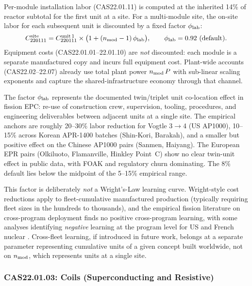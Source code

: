 \documentclass{article}
\begin{document}
Per-module installation labor (CAS22.01.11) is computed at the
inherited 14\% of reactor subtotal for the first unit at a site. For
a multi-module site, the on-site labor for each subsequent unit is
discounted by a fixed factor $\phi_{\rm lab}$:
\begin{equation}
\label{eq:multi-unit-labor}
C_{220111}^{\rm site}
  = C_{220111}^{\rm unit\,1}
    \times \bigl(1 + (n_{\rm mod}-1)\,\phi_{\rm lab}\bigr),
\qquad \phi_{\rm lab} = 0.92~\text{(default)}.
\end{equation}
Equipment costs (CAS22.01.01--22.01.10) are \emph{not} discounted:
each module is a separate manufactured copy and incurs full equipment
cost. Plant-wide accounts (CAS22.02--22.07) already use total plant
power $n_{\rm mod}\,P$ with sub-linear scaling exponents and capture
the shared-infrastructure economy through that channel.

The factor $\phi_{\rm lab}$ represents the documented twin/triplet
unit co-location effect in fission EPC: re-use of construction crew,
supervision, tooling, procedures, and engineering deliverables
between adjacent units at a single site. The empirical anchors are
roughly 20--30\% labor reduction for Vogtle 3$\rightarrow$4 (US
AP1000), 10--15\% across Korean APR-1400 batches (Shin-Kori,
Barakah), and a smaller but positive effect on the Chinese AP1000
pairs (Sanmen, Haiyang). The European EPR pairs (Olkiluoto,
Flamanville, Hinkley Point~C) show no clear twin-unit effect in
public data, with FOAK and regulatory churn dominating. The 8\%
default lies below the midpoint of the 5--15\% empirical range.

This factor is deliberately \emph{not} a Wright's-Law learning curve.
Wright-style cost reductions apply to fleet-cumulative manufactured
production (typically requiring fleet sizes in the hundreds to
thousands), and the empirical fission literature on cross-program
deployment finds no positive cross-program learning, with some
analyses identifying \emph{negative} learning at the program level
for US and French nuclear \citep{grubler2010,lovering2016,
eashgates2020}. Cross-fleet learning, if introduced in future work,
belongs at a separate parameter representing cumulative units of a
given concept built worldwide, not on $n_{\rm mod}$, which represents
units at a single site.

\subsubsection{CAS22.01.03: Coils (Superconducting and Resistive)}
\label{sec:cas2203}
\end{document}
